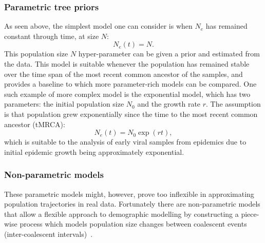 \subsubsection{Parametric tree priors}

As seen above, the simplest model one can consider is when $N_e$ has remained constant through time, at size $N$:
$$ N_e (t) = N.$$
This population size $N$ hyper-parameter can be given a prior and estimated from the data.
This model is suitable whenever the population has remained stable over the time span of the most recent common ancestor of the samples, and provides a baseline to which more parameter-rich models can be compared.
One such example of more complex model is the exponential model, which has two parameters: the initial population size $N_0$ and the growth rate $r$.
The assumption is that population grew exponentially since the time to the most recent common ancestor (tMRCA):
$$ N_e(t) = N_0 \exp(rt), $$
which is suitable to the analysis of early viral samples from epidemics due to initial epidemic growth being approximately exponential.

\subsubsection{Non-parametric models}

These parametric models might, however, prove too inflexible in approximating population trajectories in real data.
Fortunately there are non-parametric models that allow a flexible approach to demographic modelling by constructing a piece-wise process which models population size changes between coalescent events (inter-coalescent intervals)~\citep{Pybus2000,Minin2008,Gill2012}.

